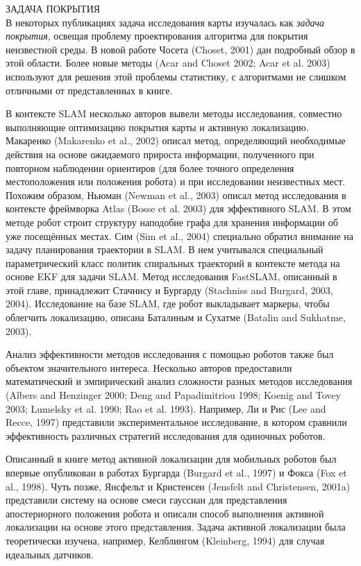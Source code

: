 \documentclass[10pt,a4paper]{article}
\begin{document}
ЗАДАЧА ПОКРЫТИЯ\\

В некоторых публикациях задача исследования карты изучалась как \textit{задача покрытия}, освещая проблему проектирования алгоритма для покрытия неизвестной среды. В новой работе Чосета (Choset, 2001) дан подробный обзор в этой области. Более новые методы (Acar and Choset 2002; Acar et al. 2003) используют для решения этой проблемы статистику, с алгоритмами не слишком отличными от представленных в книге.

В контексте SLAM несколько авторов вывели методы исследования, совместно выполняющие оптимизацию покрытия карты и активную локализацию. Макаренко (Makarenko et al., 2002) описал метод, определяющий необходимые действия на основе ожидаемого прироста информации, полученного при повторном наблюдении ориентиров (для более точного определения местоположения или положения робота) и при исследовании неизвестных мест. Похожим образом, Ньюман (Newman et al., 2003) описал метод исследования в контексте фреймворка  Atlas (Bosse et al. 2003) для эффективного SLAM. В этом методе робот строит структуру наподобие графа для хранения информации об уже посещённых местах. Сим (Sim et al., 2004) специально обратил внимание на задачу планирования траектории в SLAM. В нем учитывался специальный параметрический класс политик спиральных траекторий в контексте метода на основе EKF для задачи SLAM. Метод исследования FastSLAM, описанный в этой главе, принадлежит Стачнису и Бургарду  (Stachniss and Burgard, 2003, 2004). Исследование на базе SLAM, где робот выкладывает маркеры, чтобы облегчить локализацию, описана Баталиным и Сухатме (Batalin and Sukhatme,  2003).

Анализ эффективности методов исследования с помощью роботов также был объектом значительного интереса. Несколько авторов предоставили математический и эмпирический анализ сложности разных методов исследования (Albers and Henzinger 2000; Deng and Papadimitriou 1998; Koenig and Tovey 2003; Lumelsky et al. 1990; Rao et al. 1993). Например, Ли и Рис (Lee and Recce, 1997) представили экспериментальное исследование, в котором сравнили эффективность различных стратегий исследования для одиночных роботов.

Описанный в книге метод активной локализации для мобильных роботов был впервые опубликован в работах Бургарда (Burgard et al., 1997) и Фокса (Fox et al., 1998). Чуть позже, Янсфельт и Кристенсен (Jensfelt and Christensen, 2001a) представили систему на основе смеси гауссиан для представления апостериорного положения робота и описали способ выполнения активной локализации на основе этого представления. Задача активной локализации была теоретически изучена, например, Келблингом (Kleinberg, 1994) для случая идеальных датчиков.
\end{document}
